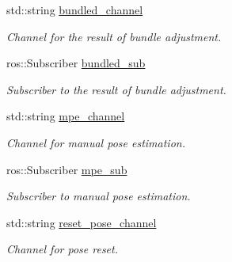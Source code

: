 \begin{DoxyCompactItemize}
\mbox{\label{classMappingNode_a44acf27c881fa63381fff82e47256013}} 
std\+::string \hyperlink{classMappingNode_a44acf27c881fa63381fff82e47256013}{bundled\+\_\+channel}
\begin{DoxyCompactList}\small\item\em Channel for the result of bundle adjustment. \end{DoxyCompactList}\item 
\mbox{\label{classMappingNode_a1e5c97dce7fb51bfaa72feb35c347722}} 
ros\+::\+Subscriber \hyperlink{classMappingNode_a1e5c97dce7fb51bfaa72feb35c347722}{bundled\+\_\+sub}
\begin{DoxyCompactList}\small\item\em Subscriber to the result of bundle adjustment. \end{DoxyCompactList}\item 
\mbox{\label{classMappingNode_a9a1f52834bd83b17a42480eb6c8f6006}} 
std\+::string \hyperlink{classMappingNode_a9a1f52834bd83b17a42480eb6c8f6006}{mpe\+\_\+channel}
\begin{DoxyCompactList}\small\item\em Channel for manual pose estimation. \end{DoxyCompactList}\item 
\mbox{\label{classMappingNode_a4232e49c66a581c5c2a02210b535a5c9}} 
ros\+::\+Subscriber \hyperlink{classMappingNode_a4232e49c66a581c5c2a02210b535a5c9}{mpe\+\_\+sub}
\begin{DoxyCompactList}\small\item\em Subscriber to manual pose estimation. \end{DoxyCompactList}\item 
\mbox{\label{classMappingNode_a879300a066e593dd2a6487c6817519bf}} 
std\+::string \hyperlink{classMappingNode_a879300a066e593dd2a6487c6817519bf}{reset\+\_\+pose\+\_\+channel}
\begin{DoxyCompactList}\small\item\em Channel for pose reset. \end{DoxyCompactList}\item 
\mbox{\label{classMappingNode_a4648040b15f5692bf1127147a524e436}} 

\end{DoxyCompactItemize}
